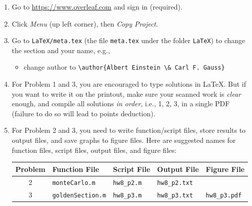\begin{enumerate}[label={\arabic*.}]
  \item Go to \url{https://www.overleaf.com} and sign in (required).
  \item Click \emph{Menu} (up left corner), then \emph{Copy Project}.
  \item Go to \verb|LaTeX/meta.tex| (the file \verb|meta.tex| under the folder \verb|LaTeX|) to change the section and your name, e.g.,
    \begin{itemize}
      \item change author to \verb|\author{Albert Einstein \& Carl F. Gauss}|
    \end{itemize}
  \item For Problem 1 and 3, you are encouraged to type solutions in \LaTeX{}. But if you want to write it on the printout, make sure your scanned work is \emph{clear} enough, and compile all solutions \emph{in order}, i.e., 1, 2, 3, in a single PDF (failure to do so will lead to points deduction).
  \item For Problem 2 and 3, you need to write function/script files, store results to output files, and save graphs to figure files. Here are suggested names for function files, script files, output files, and figure files:
    \begin{table}[!hbtp]
      \centering
      \begin{tabular}{cllll}
        \toprule
        Problem & Function File          & Script File     & Output File       & Figure File         \\
        \midrule
        2       & \verb|monteCarlo.m|    & \verb|hw8_p2.m| & \verb|hw8_p2.txt| &                     \\
        3       & \verb|goldenSection.m| & \verb|hw8_p3.m| & \verb|hw8_p3.txt| & \verb|hw8_p3.pdf|   \\
        \bottomrule
      \end{tabular}
    \end{table}


\end{enumerate}
